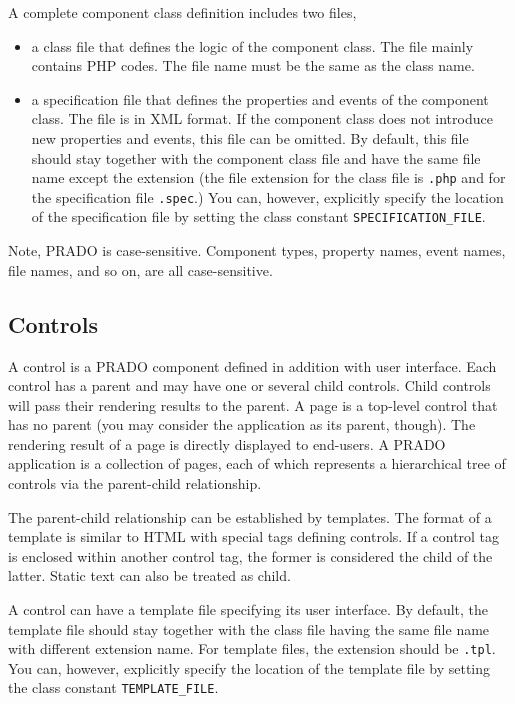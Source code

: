 \documentclass{book}
\begin{document}
A complete component class definition includes two files,
\begin{itemize}
\item a class file that defines the logic of the component class.
The file mainly contains PHP codes. The file name must be the same
as the class name.

\item a specification file that defines the properties and events
of the component class. The file is in XML format. If the
component class does not introduce new properties and events, this
file can be omitted. By default, this file should stay together with the
component class file and have the same file name except the
extension (the file extension for the class file is \verb|.php|
and for the specification file \verb|.spec|.) You can, however,
explicitly specify the location of the specification file by
setting the class constant \verb|SPECIFICATION_FILE|.

\end{itemize}

Note, PRADO is case-sensitive. Component types, property names,
event names, file names, and so on, are all case-sensitive.


\subsection{Controls}

A control is a PRADO component defined in addition with user
interface. Each control has a parent and may have one or several child controls. 
Child controls will pass their rendering results to the parent.
A page is a top-level control that has no parent (you may consider the
application as its parent, though). The rendering result of a page
is directly displayed to end-users. A PRADO application is a
collection of pages, each of which represents a hierarchical tree
of controls via the parent-child relationship.


The parent-child relationship can be established by templates. The
format of a template is similar to HTML with special tags defining
controls. If a control tag is enclosed within another control tag,
the former is considered the child of the latter. Static text can
also be treated as child.


A control can have a template file specifying its user interface.
By default, the template file should stay together 
with the class file having the same file name with different extension
name. For template files, the extension should be \verb|.tpl|.
You can, however, explicitly specify the location of the template file
by setting the class constant \verb|TEMPLATE_FILE|.
\end{document}
